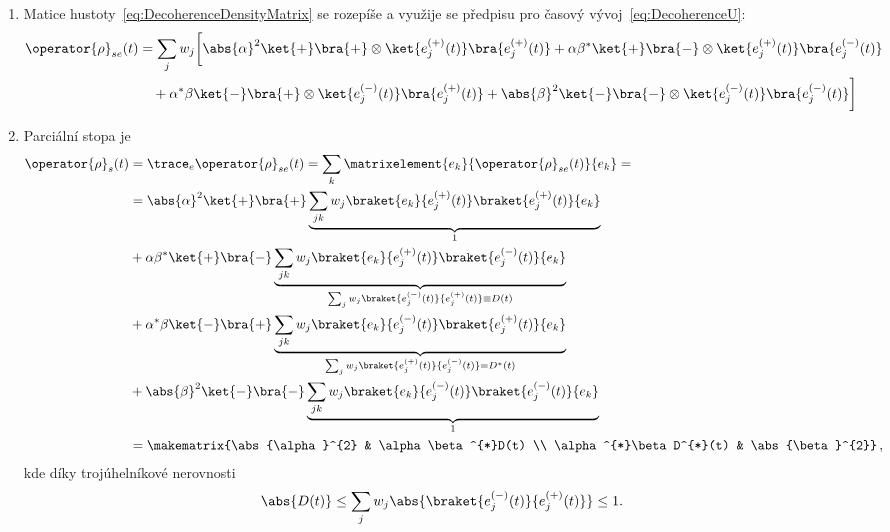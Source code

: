 \begin{solution}
	\begin{enumerate}
	\item
		Matice hustoty~\eqref{eq:DecoherenceDensityMatrix} se rozepíše a využije se předpisu pro časový vývoj~\eqref{eq:DecoherenceU}:
		\begin{align}
			\operator{\rho}_{se}(t)
				&=\sum_{j}w_{j}\bigg[\abs{\alpha}^{2}\ket{+}\bra{+}\otimes\ket{e_{j}^{(+)}(t)}\bra{e_{j}^{(+)}(t)}+\alpha\beta^{*}\ket{+}\bra{-}\otimes\ket{e_{j}^{(+)}(t)}\bra{e_{j}^{(-)}(t)}\nonumber\\
				&\quad+\alpha^{*}\beta\ket{-}\bra{+}\otimes\ket{e_{j}^{(-)}(t)}\bra{e_{j}^{(+)}(t)}+\abs{\beta}^{2}\ket{-}\bra{-}\otimes\ket{e_{j}^{(-)}(t)}\bra{e_{j}^{(-)}(t)}\bigg]
		\end{align}
	
	\item
		Parciální stopa je
		\begin{align}
			\operator{\rho}_{s}(t)
				&=\trace_{e}\operator{\rho}_{se}(t)=\sum_{k}\matrixelement{e_{k}}{\operator{\rho}_{se}(t)}{e_{k}}=\nonumber\\
				&=\abs{\alpha}^{2}\ket{+}\bra{+}\underbrace{\sum_{jk}w_{j}\braket{e_{k}}{e_{j}^{(+)}(t)}\braket{e_{j}^{(+)}(t)}{e_{k}}}_{1}\nonumber\\
				&+\alpha\beta^{*}\ket{+}\bra{-}\underbrace{\sum_{jk}w_{j}\braket{e_{k}}{e_{j}^{(+)}(t)}\braket{e_{j}^{(-)}(t)}{e_{k}}}_{\sum_{j}w_{j}\braket{e_{j}^{(-)}(t)}{e_{j}^{(+)}(t)}\equiv D(t)}\nonumber\\
				&+\alpha^{*}\beta\ket{-}\bra{+}\underbrace{\sum_{jk}w_{j}\braket{e_{k}}{e_{j}^{(-)}(t)}\braket{e_{j}^{(+)}(t)}{e_{k}}}_{\sum_{j}w_{j}\braket{e_{j}^{(+)}(t)}{e_{j}^{(-)}(t)}=D^{*}(t)}\nonumber\\
				&+\abs{\beta}^{2}\ket{-}\bra{-}\underbrace{\sum_{jk}w_{j}\braket{e_{k}}{e_{j}^{(-)}(t)}\braket{e_{j}^{(-)}(t)}{e_{k}}}_{1}\nonumber\\
				&=\makematrix{\abs{\alpha}^{2} & \alpha\beta^{*}D(t) \\ \alpha^{*}\beta D^{*}(t) & \abs{\beta}^{2}}\,,
			\label{eq:DecoherenceS}
		\end{align}
		kde díky trojúhelníkové nerovnosti
		\begin{equation}
			\abs{D(t)}\leq\sum_{j}w_{j}\abs{\braket{e_{j}^{(-)}(t)}{e_{j}^{(+)}(t)}}\leq 1.
		\end{equation}
	

\end{enumerate}
\end{solution}
